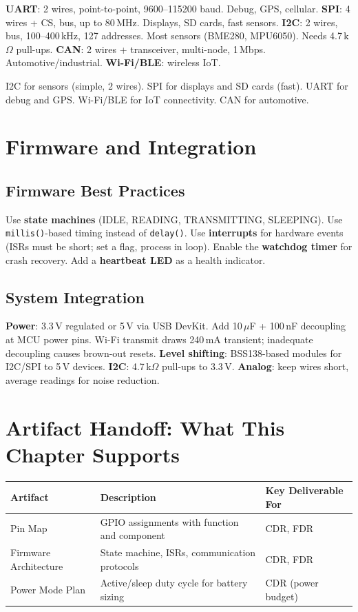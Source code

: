 \documentclass[11pt,letterpaper,twoside,openany]{book}
\begin{document}
\textbf{UART}: 2 wires, point-to-point, 9600--115200 baud. Debug, GPS, cellular. \textbf{SPI}: 4 wires + CS, bus, up to 80\,MHz. Displays, SD cards, fast sensors. \textbf{I2C}: 2 wires, bus, 100--400\,kHz, 127 addresses. Most sensors (BME280, MPU6050). Needs 4.7\,k$\Omega$ pull-ups. \textbf{CAN}: 2 wires + transceiver, multi-node, 1\,Mbps. Automotive/industrial. \textbf{Wi-Fi/BLE}: wireless IoT.

\begin{tipbox}
I2C for sensors (simple, 2 wires). SPI for displays and SD cards (fast). UART for debug and GPS. Wi-Fi/BLE for IoT connectivity. CAN for automotive.
\end{tipbox}

\section{Firmware and Integration}
\subsection{Firmware Best Practices}
Use \textbf{state machines} (IDLE, READING, TRANSMITTING, SLEEPING). Use \texttt{millis()}-based timing instead of \texttt{delay()}. Use \textbf{interrupts} for hardware events (ISRs must be short; set a flag, process in loop). Enable the \textbf{watchdog timer} for crash recovery. Add a \textbf{heartbeat LED} as a health indicator.

\subsection{System Integration}
\textbf{Power}: 3.3\,V regulated or 5\,V via USB DevKit. Add 10\,$\mu$F + 100\,nF decoupling at MCU power pins. Wi-Fi transmit draws 240\,mA transient; inadequate decoupling causes brown-out resets. \textbf{Level shifting}: BSS138-based modules for I2C/SPI to 5\,V devices. \textbf{I2C}: 4.7\,k$\Omega$ pull-ups to 3.3\,V. \textbf{Analog}: keep wires short, average readings for noise reduction.

\section{Artifact Handoff: What This Chapter Supports}
\begin{table}[htbp]\centering\small
\begin{tabularx}{\textwidth}{l X l}
\toprule
\textbf{Artifact} & \textbf{Description} & \textbf{Key Deliverable For} \\
\midrule
Pin Map & GPIO assignments with function and component & CDR, FDR \\
Firmware Architecture & State machine, ISRs, communication protocols & CDR, FDR \\
Power Mode Plan & Active/sleep duty cycle for battery sizing & CDR (power budget) \\
\bottomrule
\end{tabularx}
\end{table}
\end{document}
